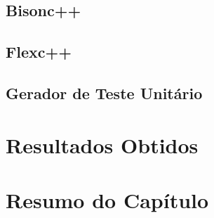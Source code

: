 \subsection{Bisonc++}

\subsection{Flexc++}

\subsection{Gerador de Teste Unitário}

\section{Resultados Obtidos}
 
\section{Resumo do Capítulo}

 